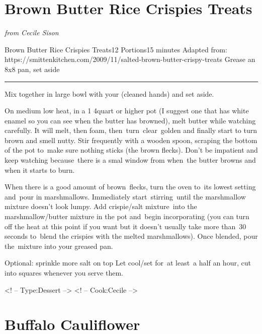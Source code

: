 \documentclass[openany]{book}
\begin{document}
\chapter{Brown Butter Rice Crispies
Treats}\label{brown-butter-rice-crispies-treats}

\emph{from Cecile Sison}

\begin{recipe}{Brown Butter Rice Crispies Treats}{12 Portions}{15 minutes}
\freeform Adapted from: https://smittenkitchen.com/2009/11/salted-brown-butter-crispy-treats
\freeform Grease an 8x8 pan, set aside
\freeform\rule{\textwidth}{0.05pt}

Mix together in large bowl with your (cleaned hands) and set aside.

On medium low heat, in a 1 4quart or higher pot (I suggest one that has white enamel so you can see when the butter has browned), melt butter while watching carefully. It will melt, then foam, then turn clear golden and finally start to turn brown and smell nutty. Stir frequently with a wooden spoon, scraping the bottom of the pot to make sure nothing sticks (the brown flecks). Don't be impatient and keep watching because there is a smal window from when the butter browns and when it starts to burn. 

When there is a good amount of brown flecks, turn the oven to its lowest setting and pour in marshmallows. Immediately start stirring until the marshmallow mixture doesn't look lumpy.
Add crispie/salt mixture into the marshmallow/butter mixture in the pot and begin incorporating (you can turn off the heat at this point if you want but it doesn't usually take more than 30 seconds to blend the crispies with the melted marshmallows).
Once blended, pour the mixture into your greased pan.

\freeform Optional: sprinkle more salt on top
\freeform Let cool/set for at least a half an hour, cut into squares whenever you serve them.

\end{recipe}

\textless{}! -- Type:Dessert --\textgreater{} \textless{}! --
Cook:Cecile --\textgreater{}

\chapter{Buffalo Cauliflower}\label{buffalo-cauliflower}
\end{document}
